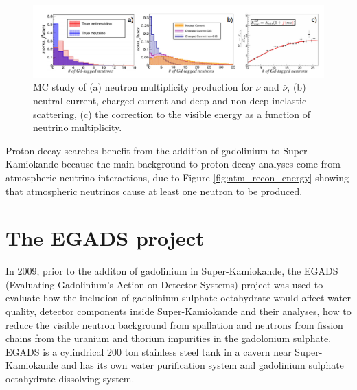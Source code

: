 \begin{figure}[h!]
    \includegraphics[scale=0.4]{Figures/atm_recon_energy.png}
\caption{MC study of (a) neutron multiplicity production for $\nu$ and ${\bar{\nu}}$, (b) neutral current, charged current and deep and non-deep inelastic scattering, (c) the correction to the visible energy as a function of neutrino multiplicity.}
\label{fig:atm_nu_energy}
\end{figure}


Proton decay searches benefit from the addition of gadolinium to Super-Kamiokande because the main background to proton decay analyses come from atmospheric neutrino interactions, due to Figure \ref{fig:atm_recon_energy} showing that atmospheric neutrinos cause at least one neutron to be produced. 

\section{The EGADS project}

In 2009, prior to the additon of gadolinium in Super-Kamiokande, the EGADS (Evaluating Gadolinium's Action on Detector Systems) project was used to evaluate how the includion of gadolinium sulphate octahydrate would affect water quality, detector components inside Super-Kamiokande and their analyses, how to reduce the visible neutron background from spallation and neutrons from fission chains from the uranium and thorium impurities in the gadolonium sulphate. EGADS is a cylindrical 200 ton stainless steel tank in a cavern near Super-Kamiokande and has its own water purification system and gadolinium sulphate octahydrate dissolving system. 



